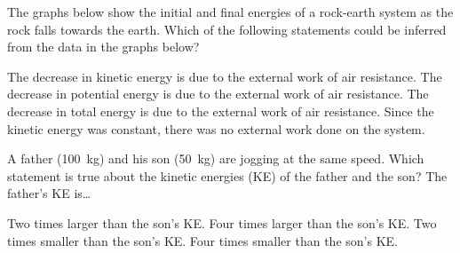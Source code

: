 \documentclass[answers]{exam}
\begin{document}
\begin{questions}
\clearpage

\question
The graphs below show the initial and final energies of a rock-earth system as the rock falls towards the earth. Which of the following statements could be inferred from the data in the graphs below?

\begin{center}
    \hspace{1cm}
\end{center}

\begin{randomizechoices}[norandomize]
    \choice The decrease in kinetic energy is due to the external work of air resistance.
    \choice The decrease in potential energy is due to the external work of air resistance.
    \correctchoice The decrease in total energy is due to the external work of air resistance.
    \choice Since the kinetic energy was constant, there was no external work done on the system.
\end{randomizechoices}


\question
A father (\SI{100}{kg}) and his son (\SI{50}{kg}) are jogging at the same speed. Which statement is true about the kinetic energies (KE) of the father and the son? The father's KE is\dots

\begin{randomizechoices}[norandomize]
    \correctchoice Two times larger than the son's KE.
    \choice Four times larger than the son's KE.   
    \choice Two times smaller than the son's KE.
    \choice Four times smaller than the son's KE.
\end{randomizechoices}


\end{questions}
\end{document}
